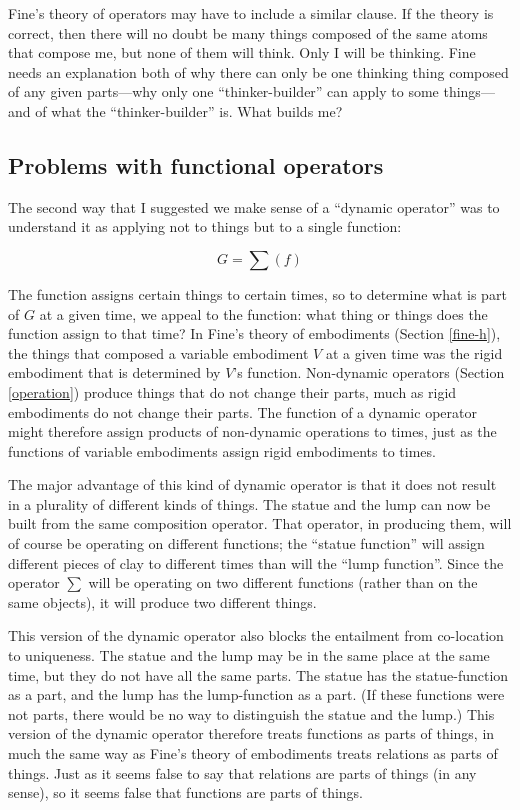 \documentclass[11pt]{article}
\begin{document}
\begin{spacing}{1.5}
Fine's theory of operators may have to include a similar clause.  If
the theory is correct, then there will no doubt be many things
composed of the same atoms that compose me, but none of them will
think.  Only I will be thinking.  Fine needs an explanation both of
why there can only be one thinking thing composed of any given
parts---why only one ``thinker-builder'' can apply to some
things---and of what the ``thinker-builder'' is.  What builds me?

\subsection{Problems with functional operators}
\label{problems2b}
The second way that I suggested we make sense of a ``dynamic
operator'' was to understand it as applying not to things but to a
single function:

\begin{displaymath}
G = \sum ( f )
\end{displaymath}

The function assigns certain things to certain times, so to determine
what is part of $G$ at a given time, we appeal to the function: what
thing or things does the function assign to that time?  In Fine's
theory of embodiments (Section \ref{fine-h}), the things that composed
a variable embodiment $V$ at a given time was the rigid embodiment
that is determined by $V$'s function.  Non-dynamic operators (Section
\ref{operation}) produce things that do not change their parts, much
as rigid embodiments do not change their parts.  The function of a
dynamic operator might therefore assign products of non-dynamic
operations to times, just as the functions of variable embodiments
assign rigid embodiments to times.

The major advantage of this kind of dynamic operator is that it does
not result in a plurality of different kinds of things.  The statue
and the lump can now be built from the same composition operator.
That operator, in producing them, will of course be operating on
different functions; the ``statue function'' will assign different
pieces of clay to different times than will the ``lump function''.
Since the operator $\sum$ will be operating on two different functions
(rather than on the same objects), it will produce two different
things.

This version of the dynamic operator also blocks the entailment from
co-location to uniqueness.  The statue and the lump may be in the same
place at the same time, but they do not have all the same parts.  The
statue has the statue-function as a part, and the lump has the
lump-function as a part.  (If these functions were not parts, there
would be no way to distinguish the statue and the lump.)  This version
of the dynamic operator therefore treats functions as parts of things,
in much the same way as Fine's theory of embodiments treats relations
as parts of things.  Just as it seems false to say that relations are
parts of things (in any sense), so it seems false that functions are
parts of things.


\end{spacing}
\end{document}
